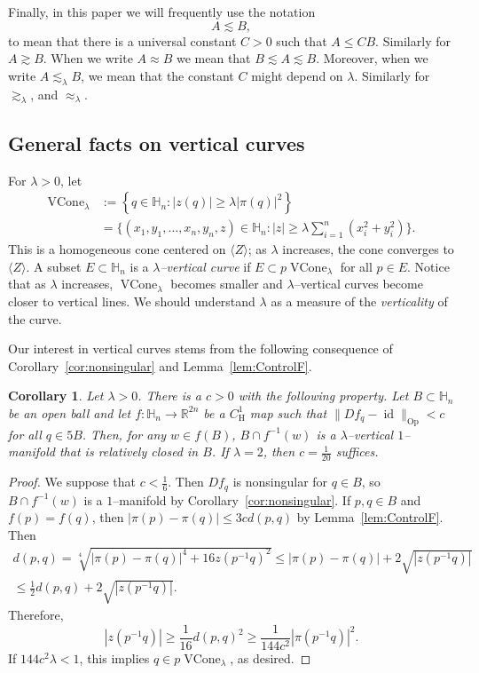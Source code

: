 \documentclass[12pt,reqno]{amsart}
\newcommand{\HH}{\mathbb{H}}
\newcommand{\R}{\mathbb{R}}
\newcommand{\from}{\colon}
\newtheorem{cor}[thm]{Corollary}
\theoremstyle{remark}
\newcommand{\0}{\mathbf{0}}
\renewcommand{\1}{\mathbf 1}
\DeclareMathOperator{\VCone}{VCone}
\DeclareMathOperator{\id}{id}
\begin{document}
Finally, in this paper we will frequently use the notation
\[
A \lesssim B,
\]
to mean that there is a universal constant $C>0$ such that $A\leq CB$. Similarly for $A\gtrsim B$. When we write $A\approx B$ we mean that $B\lesssim A \lesssim B$. Moreover, when we write $A\lesssim_{\lambda} B$, we mean that the constant $C$ might depend on $\lambda$. Similarly for $\gtrsim_{\lambda}$, and $\approx_\lambda$.


\subsection{General facts on vertical curves}\label{sec:verticalcurves}
 For $\lambda>0$, let
\begin{equation}\label{eqn:Vcone}
  \begin{split}
    \VCone_\lambda & := \left\{q\in \HH_n : |z(q)| \ge \lambda |\pi(q)|^2\right\} \\ 
    & = 
  \bigg\{(x_1,y_1,\ldots,x_n,y_n,z)\in \HH_n : |z| \ge \lambda \sum_{i=1}^n(x_i^2+y_i^2)\bigg\}.
  \end{split}
\end{equation}
This is a homogeneous cone centered on $\langle Z\rangle$; as $\lambda$ increases, the cone converges to $\langle Z\rangle$. A subset $E\subset \HH_n$ is a \emph{$\lambda$--vertical curve} if $E\subset p \VCone_\lambda$ for all $p\in E$. Notice that as $\lambda$ increases, $\VCone_\lambda$ becomes smaller and $\lambda$--vertical curves become closer to vertical lines. We should understand $\lambda$ as a measure of the \emph{verticality} of the curve.

Our interest in vertical curves stems from the following consequence of Corollary~\ref{cor:nonsingular} and  Lemma~\ref{lem:ControlF}. 
\begin{cor}\label{cor:fibers-are-vertical}
  Let $\lambda > 0$. There is a $c>0$ with the following property. 
  Let $B \subset \HH_n$ be an open ball and let $f\from \HH_n \to \R^{2n}$ be a $C^1_{\mathrm{H}}$ map such that $\|Df_q - \id\|_{\mathrm{Op}} < c$ for all $q\in 5B$. Then, for any $w\in f(B)$, $B\cap f^{-1}(w)$ is a $\lambda$--vertical $1$--manifold that is relatively closed in $B$. If $\lambda = 2$, then $c = \frac{1}{20}$ suffices.
\end{cor}
\begin{proof}
  We suppose that $c<\frac{1}{6}$. Then $Df_q$ is nonsingular for $q\in B$, so $B\cap f^{-1}(w)$ is a $1$--manifold by Corollary~\ref{cor:nonsingular}.
  If $p,q\in B$ and $f(p) = f(q)$, then $|\pi(p)-\pi(q)|\le 3c d(p,q)$ by Lemma~\ref{lem:ControlF}. Then
  \begin{multline*}
    d(p,q) = \sqrt[4]{|\pi(p) - \pi(q)|^4 + 16 z(p^{-1}q)^2} \le |\pi(p) - \pi(q)| + 2\sqrt{|z(p^{-1}q)|} \\
    \le \frac{1}{2} d(p,q) + 2\sqrt{|z(p^{-1}q)|}.
  \end{multline*}
  Therefore, 
  $$|z(p^{-1}q)| \ge \frac{1}{16} d(p,q)^2 \ge \frac{1}{144 c^2} |\pi(p^{-1}q)|^2.$$
  If $144c^2\lambda < 1$, this implies $q\in p\VCone_\lambda$, as desired. 
\end{proof}
\end{document}
